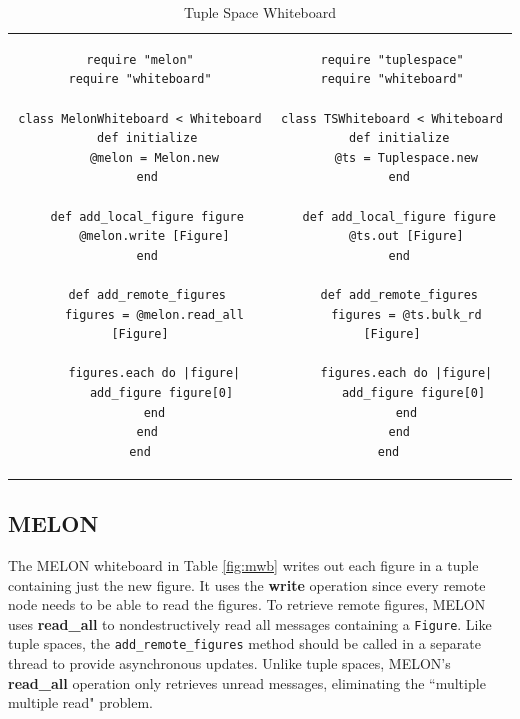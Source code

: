 \documentclass{llncs}
\begin{document}
\begin{table}
\centering
\begin{tabular}{c c}
\begin{minipage}{2.75in}
\begin{verbatim}
require "melon"
require "whiteboard"

class MelonWhiteboard < Whiteboard
  def initialize
    @melon = Melon.new
  end
  
  def add_local_figure figure
    @melon.write [Figure]
  end

  def add_remote_figures
    figures = @melon.read_all [Figure]

    figures.each do |figure|
      add_figure figure[0]
    end
  end
end
\end{verbatim}
\caption{MELON Whiteboard}
\end{minipage}\label{fig:mwb}
&
\begin{minipage}{2.5in}
\begin{verbatim}
require "tuplespace"
require "whiteboard"

class TSWhiteboard < Whiteboard
  def initialize
    @ts = Tuplespace.new
  end

  def add_local_figure figure
    @ts.out [Figure]
  end

  def add_remote_figures
    figures = @ts.bulk_rd [Figure]

    figures.each do |figure|
      add_figure figure[0]
    end
  end
end	
\end{verbatim}
\caption{Tuple Space Whiteboard}
\end{minipage}\label{fig:tswb}
\end{tabular}
\end{table}

\subsection{MELON}

The MELON whiteboard in Table \ref{fig:mwb} writes out each figure in a tuple containing just the new figure. It uses the \textbf{write} operation since every remote node needs to be able to read the figures. To retrieve remote figures, MELON uses \textbf{read\_all} to nondestructively read all messages containing a \texttt{Figure}. Like tuple spaces, the \texttt{add\_remote\_figures} method should be called in a separate thread to provide asynchronous updates. Unlike tuple spaces, MELON's \textbf{read\_all} operation only retrieves unread messages, eliminating the ``multiple multiple read" problem.
\end{document}
